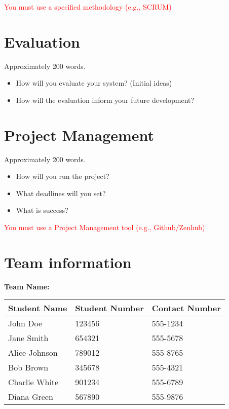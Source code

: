 \documentclass[a4paper,12pt]{article}
\begin{document}
\textcolor{red}{You must use a specified methodology (e.g., SCRUM)}

\newpage
\section{Evaluation}

\vspace{0.2cm}
Approximately 200 words.
\begin{itemize}
    \item How will you evaluate your system? (Initial ideas)
    \item How will the evaluation inform your future development?
\end{itemize}

\newpage
\section{Project Management}

\vspace{0.2cm}
Approximately 200 words.
\begin{itemize}
    \item How will you run the project?
    \item What deadlines will you set?
    \item What is success?
\end{itemize}

\textcolor{red}{You must use a Project Management tool (e.g., Github/Zenhub)}

\newpage
\section{Team information}
\textbf{Team Name:} \underline{\hspace{10cm}}

\vspace{0.2cm}
\begin{table}[h]
    \centering
    \begin{tabularx}{\textwidth}{@{}X l l@{}}
        \toprule
        Student Name & Student Number & Contact Number \\ \midrule
        John Doe & 123456 & 555-1234 \\
        Jane Smith & 654321 & 555-5678 \\
        Alice Johnson & 789012 & 555-8765 \\
        Bob Brown & 345678 & 555-4321 \\
        Charlie White & 901234 & 555-6789 \\
        Diana Green & 567890 & 555-9876 \\ \bottomrule
    \end{tabularx}
\end{table}
\end{document}
